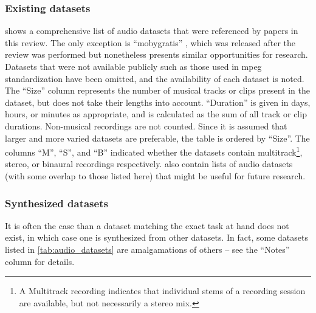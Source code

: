 \documentclass[referee,pdflatex,sn-mathphys-num]{sn-jnl}%
\newcommand{\q}[1]{\enquote{#1}}
\begin{document}
\subsubsection{Existing datasets}
\label{sec:existing_audio_datasets}
 shows a comprehensive list of audio datasets that were referenced by papers in this review. The only exception is \q{mobygratis} \cite{MobygratisFreeMoby2025}, which was released after the review was performed but nonetheless presents similar opportunities for research. Datasets that were not available publicly such as those used in \gls{mpeg} standardization have been omitted, and the availability of each dataset is noted. The \q{Size} column represents the number of musical tracks or clips present in the dataset, but does not take their lengths into account. \q{Duration} is given in days, hours, or minutes as appropriate, and is calculated as the sum of all track or clip durations. Non-musical recordings are not counted. Since it is assumed that larger and more varied datasets are preferable, the table is ordered by \q{Size}. The columns \q{M}, \q{S}, and \q{B} indicated whether the datasets contain multitrack\footnote{A Multitrack recording indicates that individual stems of a recording session are available, but not necessarily a stereo mix.}, stereo, or binaural recordings respectively. \cite{IEEESignalProcessing2025,liCreatingMultitrackClassical2019,bogdanovMTGJamendoDatasetAutomatic2019} also contain lists of audio datasets (with some overlap to those listed here) that might be useful for future research.

\begin{table}
\setlength{\abovecaptionskip}{2pt} %
\caption{
Audio datasets, ordered by size (number of tracks or clips).\\
{\footnotesize
M=Multitrack, S=Stereo, B=Binaural\\
\textsuperscript{$\star$}Individual tracks. \textsuperscript{$\dagger$}Individual files. \textsuperscript{$\ddagger$}Must request access. \textsuperscript{$\S$}Exact size unclear. \textsuperscript{$\|$}Instrument recordings. }\vspace{0.618em}
}
\label{tab:audio_datasets}
\setlength{\tabcolsep}{0.25em}
{\footnotesize

}
\end{table}


\subsubsection{Synthesized datasets}
\label{sec:synthesized_audio_datasets}
It is often the case than a dataset matching the exact task at hand does not exist, in which case one is synthesized from other datasets. In fact, some datasets listed in \cref{tab:audio_datasets} are amalgamations of others -- see the \q{Notes} column for details.
\end{document}
